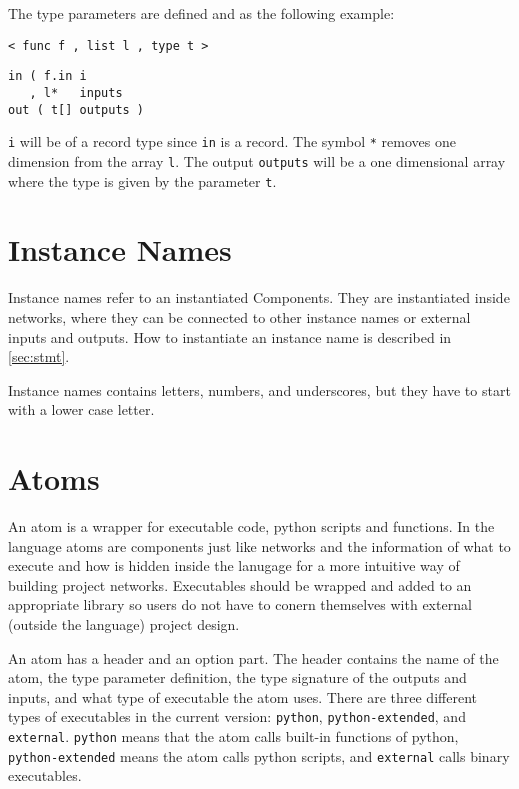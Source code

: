 The type parameters are defined and as the following example:

\begin{verbatim}
< func f , list l , type t >
\end{verbatim}

\begin{verbatim}
in ( f.in i
   , l*   inputs
out ( t[] outputs )
\end{verbatim}

\verb#i# will be of a record type since \verb#in# is a record. The
symbol \verb#*# removes one dimension from the array \verb#l#. The
output \verb#outputs# will be a one dimensional array where the type
is given by the parameter \verb#t#.




\section{Instance Names}
Instance names refer to an instantiated Components. They are
instantiated inside networks, where they can be connected to other
instance names or external inputs and outputs. How to instantiate an
instance name is described in \autoref{sec:stmt}.

Instance names contains letters, numbers, and underscores, but they
have to start with a lower case letter.

\section{Atoms}\label{sec:atom}
An atom is a wrapper for executable code, python scripts and
functions. In the language atoms are components just like networks and
the information of what to execute and how is hidden inside the
lanugage for a more intuitive way of building project
networks. Executables should be wrapped and added to an appropriate
library so users do not have to conern themselves with external
(outside the language) project design.

An atom has a header and an option part. The header contains the name
of the atom, the type parameter definition, the type signature of the
outputs and inputs, and what type of executable the atom uses. There
are three different types of executables in the current version:
\verb#python#, \verb#python-extended#, and
\verb#external#. \verb#python# means that the atom calls built-in
functions of python, \verb#python-extended# means the atom calls
python scripts, and \verb#external# calls binary executables.


